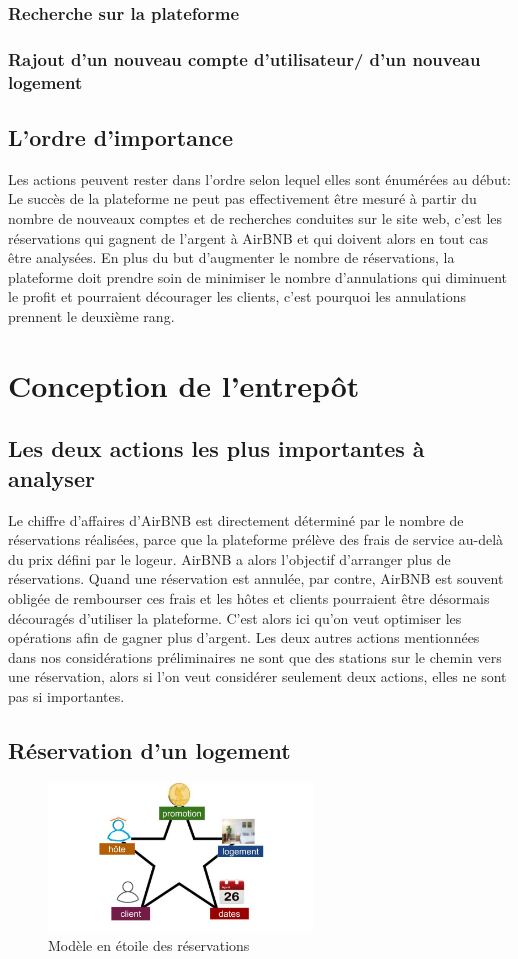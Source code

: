 \documentclass[11pt]{article}
\begin{document}
\subsubsection*{Recherche sur la plateforme}
\subsubsection*{Rajout d'un nouveau compte d'utilisateur/ d'un nouveau logement}
\subsection{L'ordre d'importance}
Les actions peuvent rester dans l'ordre selon lequel elles sont énumérées au début: Le succès de la plateforme ne peut pas effectivement être mesuré à partir du nombre de nouveaux comptes et de recherches conduites sur le site web, c'est les réservations qui gagnent de l'argent à AirBNB et qui doivent alors en tout cas être analysées. 
En plus du but d'augmenter le nombre de réservations, la plateforme doit prendre soin de minimiser le nombre d'annulations qui diminuent le profit et pourraient décourager les clients, c'est pourquoi les annulations prennent le deuxième rang.
\section{Conception de l'entrepôt}
\subsection{Les deux actions les plus importantes à analyser}
Le chiffre d'affaires d'AirBNB est directement déterminé par le nombre de réservations réalisées, parce que la plateforme prélève des frais de service au-delà du prix défini par le logeur. AirBNB a alors l'objectif d'arranger plus de réservations. Quand une réservation est annulée, par contre, AirBNB est souvent obligée de rembourser ces frais et les hôtes et clients pourraient être désormais découragés d'utiliser la plateforme. C'est alors ici qu'on veut optimiser les opérations afin de gagner plus d'argent. Les deux autres actions mentionnées dans nos considérations préliminaires ne sont que des stations sur le chemin vers une réservation, alors si l'on veut considérer seulement deux actions, elles ne sont pas si importantes.
\subsection{Réservation d'un logement}
\begin{figure}[h]
	\centering
	\includegraphics*[width=7cm]{img/modele_etoile_reservation.jpg}
	\caption{Modèle en étoile des réservations}
\end{figure}
\end{document}
